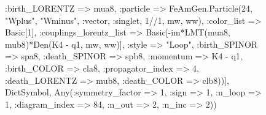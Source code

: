 \documentclass{revtex4}
\begin{document}
\begin{figure}[!htb]
\begin{center}
{:birth_LORENTZ => mua8, :particle => FeAmGen.Particle(24, "Wplus", "Wminus", :vector, :singlet, 1//1, mw, ww), :color_list => Basic[1], :couplings_lorentz_list => Basic[-im*LMT(mua8, mub8)*Den(K4 - q1, mw, ww)], :style => "Loop", :birth_SPINOR => spa8, :death_SPINOR => spb8, :momentum => K4 - q1, :birth_COLOR => cla8, :propagator_index => 4, :death_LORENTZ => mub8, :death_COLOR => clb8))], Dict{Symbol, Any}(:symmetry_factor => 1, :sign => 1, :n_loop => 1, :diagram_index => 84, :n_out => 2, :n_inc => 2)) 
}
\end{center}
\end{figure}
\end{document}
